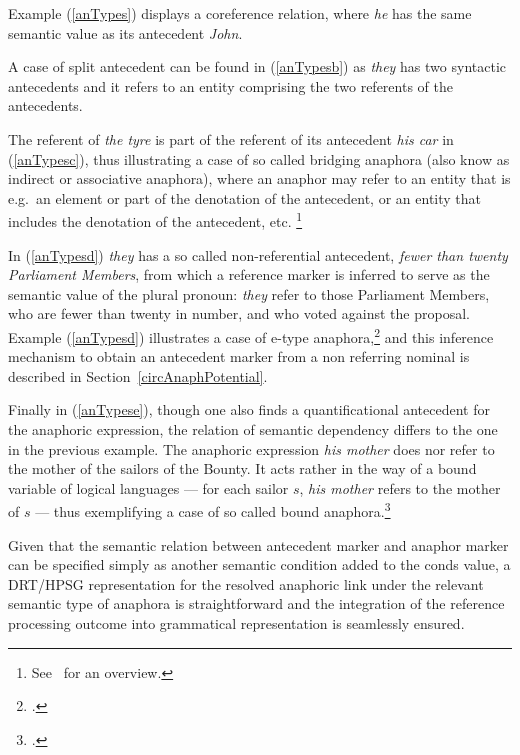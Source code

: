 \documentclass[output=paper
	        ,collection
	        ,collectionchapter
 	        ,biblatex
                ,babelshorthands
                ,newtxmath
                ,draftmode
                ,colorlinks, citecolor=brown
]{langscibook}
\begin{document}
 Example (\ref{anTypes}) displays a coreference relation, where {\it he} has the same semantic value as its antecedent {\it John}. 
 
 A case of split antecedent can be found in (\ref{anTypesb}) as {\it they} has two syntactic antecedents and it refers to an entity comprising the two referents of the antecedents. 
 
 The referent of {\it the tyre} is part of the referent of its antecedent {\it his car} in (\ref{anTypesc}), 
 thus illustrating a case of so called bridging anaphora (also know as indirect or associative anaphora),
where an anaphor may refer to an entity that is e.g.\ an element or part 
of the denotation of the antecedent, or an entity that includes the denotation
of the antecedent, etc.%
\footnote{
See~\citep{poesio:ana98} for an overview.
}
% 

In (\ref{anTypesd}) {\it they} has 
a so called non-referential antecedent, {\it fewer than twenty Parliament Members}, 
from which a reference marker is inferred to serve as the semantic value of the plural pronoun: 
{\it they} refer to those Parliament Members, who are fewer than twenty in number, and who voted against the proposal.
 Example (\ref{anTypesd}) illustrates a case of e-type anaphora,\footnote{
\citep{evans:pron80}.} and this inference mechanism to obtain an antecedent marker
from a non referring nominal is described in Section~\ref{circAnaphPotential}. 

 Finally in (\ref{anTypese}), though one also finds a quantificational antecedent for the anaphoric expression, the relation of semantic dependency differs to the one in the previous example. The anaphoric expression {\it his mother} does nor refer to the mother of the sailors of the Bounty. It acts rather in the way of a bound variable of logical languages --- for each sailor $s$, {\it his mother} refers to the mother of $s$ --- thus exemplifying a case of so called bound anaphora.\footnote{
\citep{reinhart:bound83}.
}


Given that the semantic relation between antecedent marker and anaphor marker 
can be specified simply as another semantic condition added to the
{\sc conds} value, a DRT/HPSG representation for the resolved anaphoric
link under the relevant semantic type of anaphora is straightforward and the integration 
of the reference processing outcome into grammatical representation is seamlessly ensured.
\end{document}

